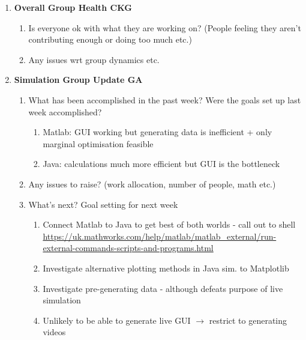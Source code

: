 \begin{enumerate}
\item  \textbf{Overall Group Health CKG}

\begin{enumerate}
\item Is everyone ok with what they are working on? (People feeling they aren't contributing enough or doing too much etc.)

\item  Any issues wrt group dynamics etc.

\end{enumerate}

\item  \textbf{Simulation Group Update GA}

\begin{enumerate}
\item What has been accomplished in the past week? Were the goals set up last week accomplished?

\begin{enumerate}
\item  Matlab: GUI working but generating data is inefficient + only marginal optimisation feasible

\item  Java: calculations much more efficient but GUI is the bottleneck
\end{enumerate}

\item  Any issues to raise? (work allocation, number of people,  math etc.)

\item  What's next? Goal setting for next week

\begin{enumerate}
\item  Connect Matlab to Java to get best of both worlds - call out to shell \url{https://uk.mathworks.com/help/matlab/matlab_external/run-external-commands-scripts-and-programs.html}

\item  Investigate alternative plotting methods in Java sim. to Matplotlib

\item  Investigate pre-generating data - although defeats purpose of live simulation

\item  Unlikely to be able to generate live GUI $\mathrm{\to}$ restrict to generating videos
\end{enumerate}


\end{enumerate}
\end{enumerate}
